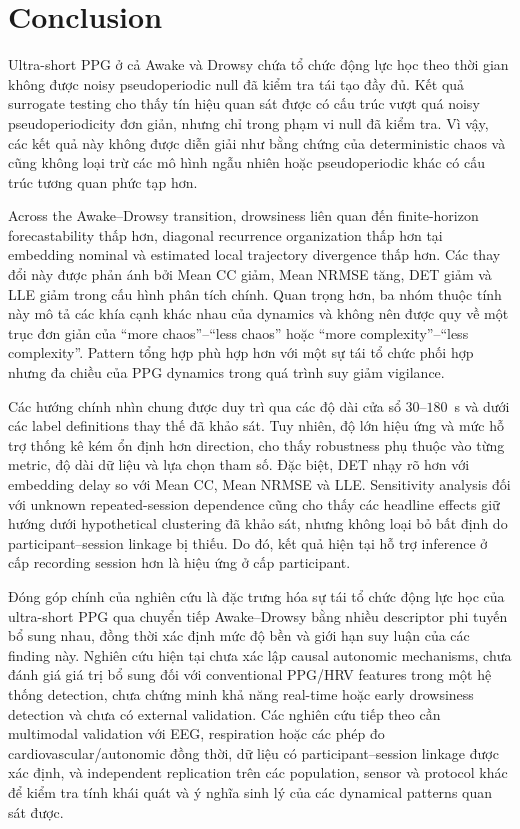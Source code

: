 \section{Conclusion}

Ultra-short PPG ở cả Awake và Drowsy chứa tổ chức động lực học theo thời gian không được noisy pseudoperiodic null đã kiểm tra tái tạo đầy đủ. Kết quả surrogate testing cho thấy tín hiệu quan sát được có cấu trúc vượt quá noisy pseudoperiodicity đơn giản, nhưng chỉ trong phạm vi null đã kiểm tra. Vì vậy, các kết quả này không được diễn giải như bằng chứng của deterministic chaos và cũng không loại trừ các mô hình ngẫu nhiên hoặc pseudoperiodic khác có cấu trúc tương quan phức tạp hơn.

Across the Awake--Drowsy transition, drowsiness liên quan đến finite-horizon forecastability thấp hơn, diagonal recurrence organization thấp hơn tại embedding nominal và estimated local trajectory divergence thấp hơn. Các thay đổi này được phản ánh bởi Mean CC giảm, Mean NRMSE tăng, DET giảm và LLE giảm trong cấu hình phân tích chính. Quan trọng hơn, ba nhóm thuộc tính này mô tả các khía cạnh khác nhau của dynamics và không nên được quy về một trục đơn giản của ``more chaos''--``less chaos'' hoặc ``more complexity''--``less complexity''. Pattern tổng hợp phù hợp hơn với một sự tái tổ chức phối hợp nhưng đa chiều của PPG dynamics trong quá trình suy giảm vigilance.

Các hướng chính nhìn chung được duy trì qua các độ dài cửa sổ $30$--$180$~s và dưới các label definitions thay thế đã khảo sát. Tuy nhiên, độ lớn hiệu ứng và mức hỗ trợ thống kê kém ổn định hơn direction, cho thấy robustness phụ thuộc vào từng metric, độ dài dữ liệu và lựa chọn tham số. Đặc biệt, DET nhạy rõ hơn với embedding delay so với Mean CC, Mean NRMSE và LLE. Sensitivity analysis đối với unknown repeated-session dependence cũng cho thấy các headline effects giữ hướng dưới hypothetical clustering đã khảo sát, nhưng không loại bỏ bất định do participant--session linkage bị thiếu. Do đó, kết quả hiện tại hỗ trợ inference ở cấp recording session hơn là hiệu ứng ở cấp participant.

Đóng góp chính của nghiên cứu là đặc trưng hóa sự tái tổ chức động lực học của ultra-short PPG qua chuyển tiếp Awake--Drowsy bằng nhiều descriptor phi tuyến bổ sung nhau, đồng thời xác định mức độ bền và giới hạn suy luận của các finding này. Nghiên cứu hiện tại chưa xác lập causal autonomic mechanisms, chưa đánh giá giá trị bổ sung đối với conventional PPG/HRV features trong một hệ thống detection, chưa chứng minh khả năng real-time hoặc early drowsiness detection và chưa có external validation. Các nghiên cứu tiếp theo cần multimodal validation với EEG, respiration hoặc các phép đo cardiovascular/autonomic đồng thời, dữ liệu có participant--session linkage được xác định, và independent replication trên các population, sensor và protocol khác để kiểm tra tính khái quát và ý nghĩa sinh lý của các dynamical patterns quan sát được.
